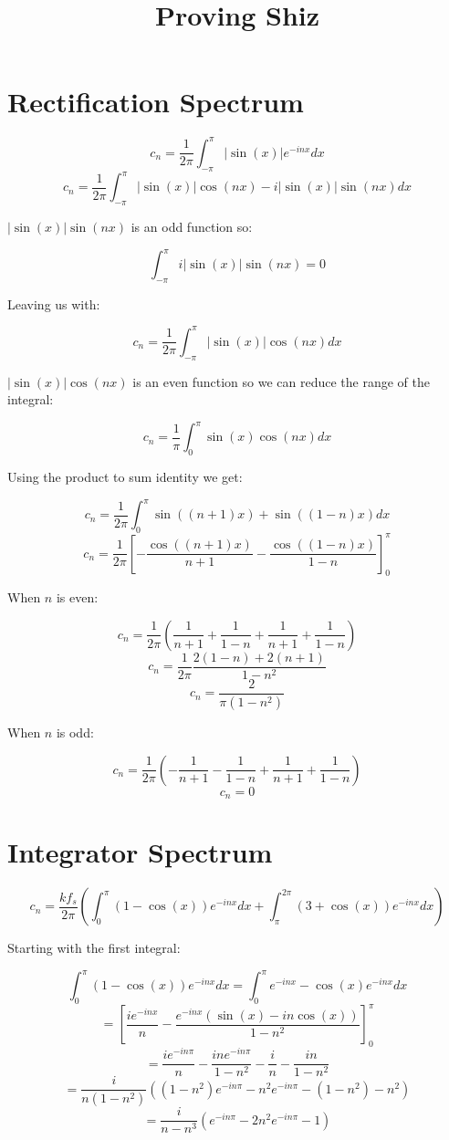 \documentclass[a4paper]{article}
\title{Proving Shiz}
\author{}
\date{}
\begin{document}
\maketitle

\section{Rectification Spectrum}
	
	\[ c_{n} = \frac{1}{2\pi} \int_{-\pi}^{\pi} |\sin(x)|e^{-inx} dx \]
	\[ c_{n} = \frac{1}{2\pi} \int_{-\pi}^{\pi} |\sin(x)|\cos(nx) - i|\sin(x)|\sin(nx) dx \]

	$|\sin(x)|\sin(nx)$ is an odd function so:

	\[ \int_{-\pi}^{\pi} i|\sin(x)|\sin(nx) = 0 \]

	Leaving us with:

	\[ c_{n} = \frac{1}{2\pi} \int_{-\pi}^{\pi} |\sin(x)|\cos(nx) dx \]

	$|\sin(x)|\cos(nx)$ is an even function so we can reduce the range of the integral:

	\[ c_{n} = \frac{1}{\pi} \int_{0}^{\pi} \sin(x)\cos(nx) dx \]

	Using the product to sum identity we get:

	\[ c_{n} = \frac{1}{2\pi} \int_{0}^{\pi} \sin((n+1)x) + \sin((1-n)x) dx \]
	\[ c_{n} = \frac{1}{2\pi} \left[ -\frac{\cos((n+1)x)}{n+1} - \frac{\cos((1-n)x)}{1-n} \right]_{0}^{\pi} \]

	When $n$ is even:

	\[ c_{n} = \frac{1}{2\pi} \left( \frac{1}{n+1} + \frac{1}{1-n} + \frac{1}{n+1} + \frac{1}{1-n} \right) \]
	\[ c_{n} = \frac{1}{2\pi} \frac{2(1-n) + 2(n+1)}{1 - n^{2}} \]
	\[ c_{n} = \frac{2}{\pi(1 - n^{2})} \]

	When $n$ is odd:

	\[ c_{n} = \frac{1}{2\pi} \left( -\frac{1}{n+1} - \frac{1}{1-n} + \frac{1}{n+1} + \frac{1}{1-n} \right) \]
	\[ c_{n} = 0 \]

\section{Integrator Spectrum}
	
	\[ c_{n} = \frac{kf_{s}}{2\pi} \left( \int_{0}^{\pi} (1-\cos(x))e^{-inx} dx
				              + \int_{\pi}^{2\pi} (3 + \cos(x))e^{-inx} dx 
			                      \right) \]

	Starting with the first integral:
	
	\[ \int_{0}^{\pi} (1-\cos(x))e^{-inx} dx = \int_{0}^{\pi} e^{-inx} - \cos(x)e^{-inx} dx \]
	\[ = \left[ \frac{ie^{-inx}}{n} - \frac{e^{-inx}(\sin(x) - in\cos(x))}{1 - n^{2}} \right]_{0}^{\pi} \]
	\[ = \frac{ie^{-in\pi}}{n} - \frac{ine^{-in\pi}}{1 - n^{2}}  - \frac{i}{n} - \frac{in}{1 - n^{2}} \]
	\[ = \frac{i}{n(1-n^{2})} \left( (1 - n^{2})e^{-in\pi} - n^{2}e^{-in\pi} - (1 - n^{2}) - n^2 \right) \]
	\[ = \frac{i}{n - n^{3}} \left( e^{-in\pi} - 2n^{2}e^{-in\pi} - 1 \right) \]
\end{document}
